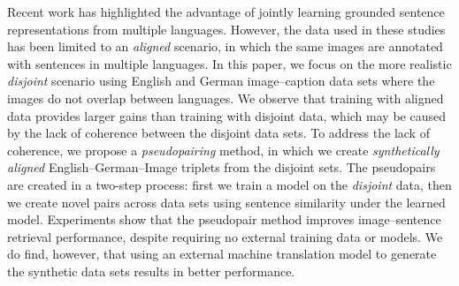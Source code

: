 Recent work has highlighted the advantage of jointly learning grounded sentence representations 
from multiple languages. 
However, the data used in these studies has 
been limited to an \emph{aligned} scenario, in which
the same images are annotated with sentences 
in multiple languages. In this paper, we focus on the more realistic 
\emph{disjoint} scenario using English and German
image--caption data sets where the images
do not overlap between languages. 
We observe that training with aligned data provides larger gains than training with disjoint data, which may be caused by the lack of coherence between the disjoint data sets. 
To address the lack of coherence, we propose a
\emph{pseudopairing} method, in which we create \emph{synthetically aligned} 
English--German--Image triplets from the disjoint sets. The pseudopairs are created in a two-step process:
first we train a model on the 
\emph{disjoint} data, then we create novel pairs across data sets using sentence similarity 
under the learned model.
Experiments show that the pseudopair method improves 
image--sentence retrieval performance, 
despite requiring no external training data or models. 
We do find, however, that using an external machine translation model to generate the synthetic data sets results
in better performance.






%





%
%



%



